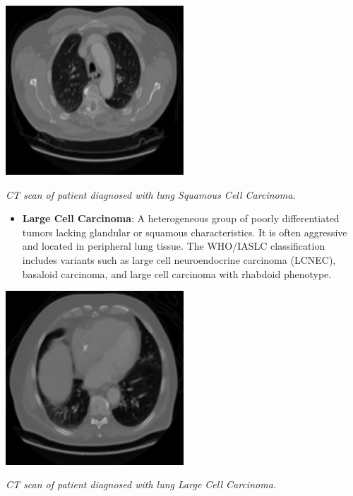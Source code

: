 \vspace{1em}
\begin{center}
    \includegraphics[width=0.5\textwidth]{../assets/01-overview/lc-scc-ct.jpg}

    \small\textit{CT scan of patient diagnosed with lung Squamous Cell Carcinoma. 
    \cite{SHATNAWI2025100188}}
\end{center}
\vspace{1em}

\begin{itemize}
    \item \textbf{Large Cell Carcinoma}: A heterogeneous group of poorly differentiated tumors 
    lacking glandular or squamous characteristics. It is often aggressive and located in peripheral 
    lung tissue. The WHO/IASLC classification includes variants such as large cell neuroendocrine 
    carcinoma (LCNEC), basaloid carcinoma, and large cell carcinoma with rhabdoid phenotype. 
    \cite{nlm2025}
\end{itemize}

\vspace{1em}
\begin{center}
    \includegraphics[width=0.5\textwidth]{../assets/01-overview/lc-lcc-ct.jpg}

    \small\textit{CT scan of patient diagnosed with lung Large Cell Carcinoma. 
    \cite{SHATNAWI2025100188}}
\end{center}
\vspace{1em}

